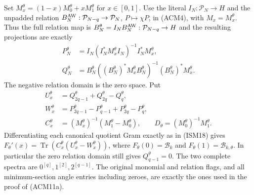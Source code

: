 Set $M_x^\theta=(1-x)M_0^\theta+xM_1^\theta$ for $x\in[0,1]$.
Use the literal $I_N:\mathcal P_N\to H$ and the unpadded relation
$B_N^{\rm AW}:\mathcal P_{N-q}\to\mathcal P_N$, $P\mapsto\chi P$,
in (ACM4), with $M_x=M_x^\theta$. Thus the full relation map is
$B_N^\theta=I_NB_N^{\rm AW}:\mathcal P_{N-q}\to H$ and the
resulting projections are exactly
\[
\begin{split}
 P_N^\theta&=I_N(I_N^*M_x^\theta I_N)^{-1}I_N^*M_x^\theta,\\
 Q_N^\theta&=B_N^\theta((B_N^\theta)^*M_x^\theta B_N^\theta)^{-1}
                                      (B_N^\theta)^*M_x^\theta.
\end{split}
\]
The negative relation domain is the zero space. Put
\[
\begin{split}
 U_x^\theta&=Q_{2q-1}^\theta+Q_{2q}^\theta-Q_q^\theta,\\
 W_x^\theta&=P_{2q-1}^\theta-P_{q-1}^\theta
                         +P_{2q}^\theta-P_q^\theta,\\
 C_x^\theta&=(M_x^\theta)^{-1}(M_1^\theta-M_0^\theta),\qquad
 D_\theta=(M_0^\theta)^{-1}M_1^\theta.
\end{split}
\tag{HC14b}
\]
Differentiating each canonical quotient Gram exactly as in (ISM18)
gives
$F_\theta'(x)=\operatorname{Tr}(C_x^\theta(U_x^\theta-W_x^\theta))$,
where $F_\theta(0)=\mathcal B_k$ and
$F_\theta(1)=\mathcal B_{k,\theta}$. In particular the zero relation
domain still gives $Q_{q-1}^\theta=0$. The two complete spectra are
$0^{[q]},1^{[2]},2^{[q-1]}$. The original monomial and relation flags,
and all minimum-section angle entries including zeroes, are exactly
the ones used in the proof of (ACM11a).

